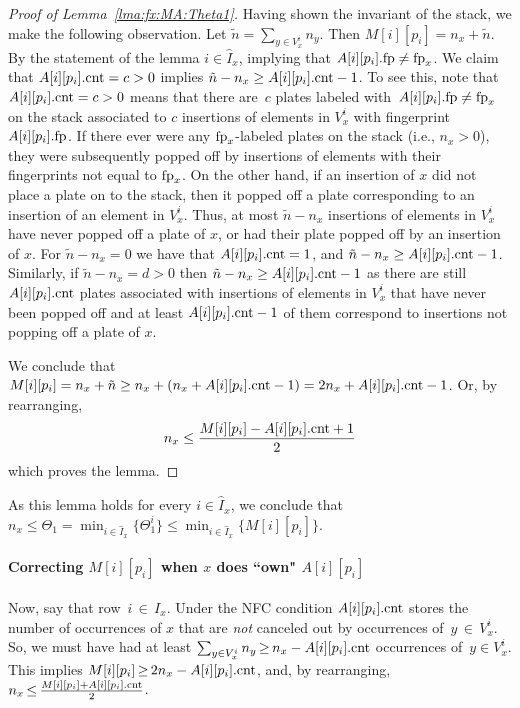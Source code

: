 \begin{proof}[Proof of Lemma~\ref{lma:fx:MA:Theta1}]
    Having shown the invariant of the stack, we make the following observation.  
    Let $\tilde{n} =  \sum_{y\in V_x^i} n_y$. Then $M[i][p_i] = n_x + \tilde{n}$. By the statement of the lemma $i \in \hat{I}_x$, implying that $A[i][p_i].\textup{fp} \neq \textup{fp}_x$.  
    We claim that $A[i][p_i].\textup{cnt}=c>0$ implies $\tilde{n}-n_x \geq A[i][p_i].\textup{cnt}-1$. To see this, note that $A[i][p_i].\textup{cnt}=c>0$ means that there are~$c$ plates labeled with~$A[i][p_i].\textup{fp} \neq \textup{fp}_x$ on the stack associated to $c$ insertions of elements in $V_x^i$ with fingerprint $A[i][p_i].\textup{fp}$. If there ever were any $\textup{fp}_x$-labeled plates on the stack (i.e., $n_x >0$), they were subsequently popped off by insertions of elements with their fingerprints not equal to $\textup{fp}_x$.  
    On the other hand, if an insertion of $x$ did not place a plate on to the stack, then it popped off a plate corresponding to an insertion of an element in $V_x^i$. Thus, at most $\tilde{n}-n_x$ insertions of elements in  
    $V_x^i$ have never popped off a plate of $x$, or had their plate popped off by an insertion of $x$.
    For $\tilde{n}-n_x = 0$ we have that $A[i][p_i].\textup{cnt}=1$,
    and $\tilde{n}-n_x \geq A[i][p_i].\textup{cnt} - 1$.  Similarly, if $\tilde{n}-n_x = d > 0$ then
    $\tilde{n}-n_x \geq A[i][p_i].\textup{cnt} - 1$ as there are still $A[i][p_i].\textup{cnt}$ plates associated with insertions of elements in $V_x^i$ that
    have never been popped off and at least $A[i][p_i].\textup{cnt}-1$ of them correspond to insertions not popping off a plate of $x$. 
    
    We conclude that 
    $
    M[i][p_i] = n_x + \tilde{n} \geq n_x + (n_x + A[i][p_i].\textup{cnt} -1) = 2n_x +  A[i][p_i].\textup{cnt} -1
    $.  Or, by rearranging,
    \[
    n_x \leq \frac{M[i][p_i] - A[i][p_i].\textup{cnt} + 1}{2}
    \] 
    which proves the lemma.
\end{proof}

\noindent
As this lemma holds for every $i \in \hat{I}_x$, we conclude that $n_x \leq \Theta_1=\min_{i \in \hat{I}_x}\{\Theta^i_1\} \leq \min_{i \in \hat{I}_x}\{M[i][p_i]\}$.  

\paragraph{Correcting $M[i][p_i]$ when $x$ does ``own" $A[i][p_i]$}
Now, say that row~$i \,{\in}\, I_x$. Under the NFC condition
$A[i][p_i].\textup{cnt}$ stores the number of occurrences of $x$ that are \textit{not} canceled out by occurrences of~$y \,{\in}\, V^i_x$. So,  
we must have had at least $\sum_{y \in V^i_x}n_y \,{\geq}\, n_x - A[i][p_i].\textup{cnt}$ occurrences of~$y \in V^i_x$. This implies $M[i][p_i] 
\,{\geq}\, 2n_x  - A[i][p_i].\textup{cnt}$, and, by rearranging, $n_x \,{\leq}\,  \frac{M[i][p_i] + A[i][p_i].\textup{cnt}}{2}$.

